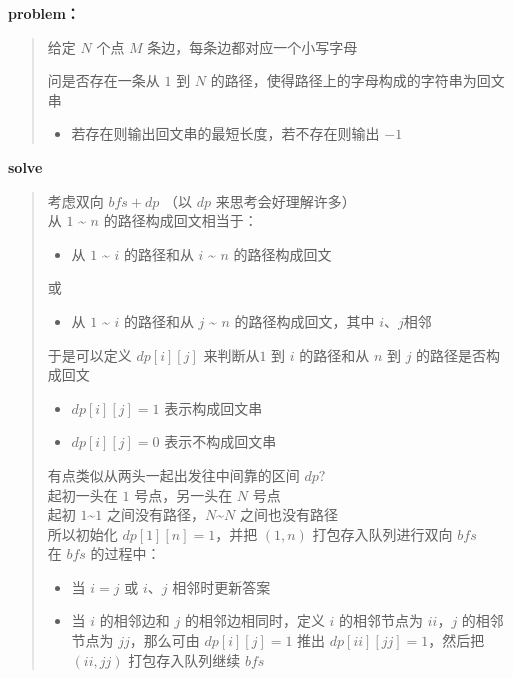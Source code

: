 \documentclass[E:/GsjzTle/main/main.tex]{subfiles}
\begin{document}
	
	\textbf{problem：}
	
	\begin{quote}
		给定 \(N\) 个点 \(M\) 条边，每条边都对应一个小写字母
		
		问是否存在一条从 \(1\) 到 \(N\)
		的路径，使得路径上的字母构成的字符串为回文串
		
		\begin{itemize}
			\item
			若存在则输出回文串的最短长度，若不存在则输出 \(-1\)
		\end{itemize}
	\end{quote}
	
	\textbf{solve}
	
	\begin{quote}
		考虑双向 \(bfs + dp\) （以 \(dp\) 来思考会好理解许多）\\
		从 \(1\) \textasciitilde{} \(n\) 的路径构成回文相当于：
		
		\begin{itemize}
			\item
			从 \(1\) \textasciitilde{} \(i\) 的路径和从 \(i\) \textasciitilde{}
			\(n\) 的路径构成回文
		\end{itemize}
		
		或
		
		\begin{itemize}
			\item
			从 \(1\) \textasciitilde{} \(i\) 的路径和从 \(j\) \textasciitilde{}
			\(n\) 的路径构成回文，其中 \(i、j\)相邻
		\end{itemize}
		
		于是可以定义 \(dp[i][j]\) 来判断从\(1\) 到 \(i\) 的路径和从 \(n\) 到
		\(j\) 的路径是否构成回文
		
		\begin{itemize}
			\item
			\(dp[i][j] = 1\) 表示构成回文串
			\item
			\(dp[i][j] = 0\) 表示不构成回文串
		\end{itemize}
		
		有点类似从两头一起出发往中间靠的区间 \(dp?\) \\
		起初一头在 \(1\) 号点，另一头在 \(N\) 号点\\
		起初 \(1\)\textasciitilde{}\(1\)
		之间没有路径，\(N\)\textasciitilde{}\(N\) 之间也没有路径\\
		所以初始化 \(dp[1][n] = 1\)，并把 \((1,n)\) 打包存入队列进行双向
		\(bfs\)\\
		在 \(bfs\) 的过程中：
		
		\begin{itemize}
			\item
			当 \(i = j\) 或 \(i、j\) 相邻时更新答案
			\item
			当 \(i\) 的相邻边和 \(j\) 的相邻边相同时，定义 \(i\) 的相邻节点为
			\(ii\)，\(j\) 的相邻节点为 \(jj\)，那么可由 \(dp[i][j] = 1\) 推出
			\(dp[ii][jj] = 1\)，然后把 \((ii,jj)\) 打包存入队列继续 \(bfs\)
		\end{itemize}
	\end{quote}
	
\end{document}
